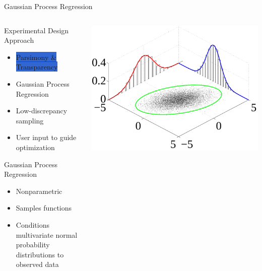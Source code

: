 \documentclass[10pt, compress, aspectratio=169, xcolor={table,usenames,dvipsnames}]{beamer}
\begin{document}
\begin{frame}[label={sec:orgdf75600}]{Gaussian Process Regression}
\begin{columns}
\begin{column}{0.5\columnwidth}
\begin{block}{Experimental Design Approach}
\begin{itemize}
\item \colorbox{Highlight}{\alert{Parsimony} \& \alert{Transparency}}
\item \alert{Gaussian Process Regression}
\item Low-discrepancy sampling
\item User input to guide optimization
\end{itemize}
\begin{block}{Gaussian Process Regression}
\begin{itemize}
\item \alert{Nonparametric}
\item Samples \alert{functions}
\item \alert{Conditions} multivariate normal probability distributions to \alert{observed data}
\end{itemize}
\end{block}
\end{block}
\end{column}
\begin{column}{0.5\columnwidth}
\begin{center}
\includegraphics[width=.95\columnwidth]{../../../img/multivariate_normal_sample.pdf}
\end{center}

\end{column}
\end{columns}
\end{frame}
\end{document}
